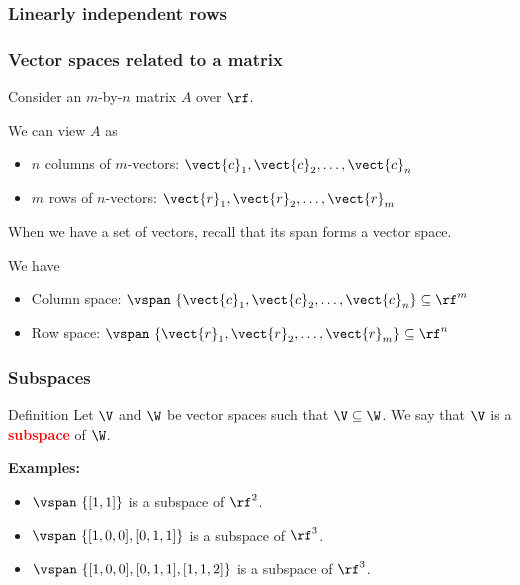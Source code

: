 \begin{frame}
  \frametitle{Linearly independent rows}
  
\end{frame}

\begin{frame}
  \frametitle{Vector spaces related to a matrix}

  Consider an $m$-by-$n$ matrix $A$ over $\rf$.

  \pause
  We can view $A$ as
  \begin{itemize}
  \item $n$ columns of $m$-vectors:
  $\vect{c}_1,\vect{c}_2,\ldots,\vect{c}_n$     
  \pause
  \item $m$ rows of $n$-vectors:
  $\vect{r}_1,\vect{r}_2,\ldots,\vect{r}_m$
  \end{itemize}

  \pause When we have a set of vectors, recall that its span forms a
  vector space.

  \vspace{0.2in}
  
  We have
  \pause
  \begin{itemize}
  \item Column space: $\vspan~\{\vect{c}_1,\vect{c}_2,\ldots,\vect{c}_n\} \subseteq \rf^{m}$     
    \pause
  \item Row space: $\vspan~\{\vect{r}_1,\vect{r}_2,\ldots,\vect{r}_m\} \subseteq \rf^{n}$
  \end{itemize}
\end{frame}

\begin{frame}
  \frametitle{Subspaces}

  \begin{block}{Definition}
    Let $\V$ and $\W$ be vector spaces such that $\V\subseteq\W$.  We
    say that $\V$ is a \textcolor{red}{\bf subspace} of $\W$.
  \end{block}

  \pause

  {\bf Examples:}
  \begin{itemize}
  \item $\vspan~\{[1,1]\}$ is a subspace of $\rf^2$.
  \item $\vspan~\{[1,0,0],[0,1,1]\}$ is a subspace of $\rf^3$.
  \item $\vspan~\{[1,0,0],[0,1,1],[1,1,2]\}$ is a subspace of $\rf^3$.
  \end{itemize}
\end{frame}

